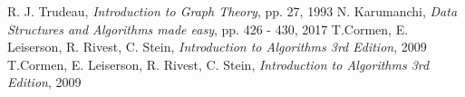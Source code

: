 
\begin{thebibliography}{100}

 R. J. Trudeau, \emph{Introduction to Graph Theory}, pp. 27, 1993
N. Karumanchi, \emph{Data Structures and Algorithms made easy}, pp. 426 - 430, 2017
T.Cormen, E. Leiserson, R. Rivest, C. Stein, \emph{Introduction to Algorithms 3rd Edition}, 2009
T.Cormen, E. Leiserson, R. Rivest, C. Stein, \emph{Introduction to Algorithms 3rd Edition}, 2009

\end{thebibliography}